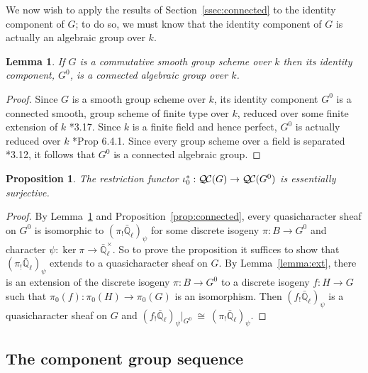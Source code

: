 \documentclass[CM,Submssn,SecEq]{degruyter-crelle} %
\theoremstyle{plain}
\newtheorem{proposition}[theorem]{Proposition}
\newtheorem{lemma}[theorem]{Lemma}
\theoremstyle{definition}
\theoremstyle{remark}
\newcommand{\EE}{\mathbb{\bar Q}_\ell}
\newcommand{\Fq}{k}
\newcommand{\EEx}{\EE^\times}
\newcommand{\iso}{{\ \cong\ }}
\newcommand{\qcs}[1]{{\mathcal{#1}}}
\newcommand{\QC}{{\mathcal{Q\hskip-0.8pt C}}}
\begin{document}
We now wish to apply the results of Section~\ref{ssec:connected} to the identity component of $G$; to do so, we must know that the identity component of $G$ is actually an algebraic group over $\Fq$.

\begin{lemma} \label{lem:G0alg-grp}
If $G$ is a commutative smooth group scheme over $\Fq$ then its identity component, $G^0$, is a connected algebraic group over $\Fq$.
\end{lemma}
\begin{proof}
 Since $G$ is a smooth group scheme over $\Fq$, its
 identity component $G^0$ is a connected smooth,
 group scheme of finite type over $\Fq$, reduced over some finite extension of $\Fq$
 \cite{vdGeer-Moonen:AbelianVarieties}*{3.17}.
 Since $\Fq$ is a finite field and hence perfect, $G^0$ is actually reduced over $\Fq$
 \cite{EGAIV2}*{Prop 6.4.1}.  Since every group scheme over a field is separated
 \cite{vdGeer-Moonen:AbelianVarieties}*{3.12},
 it follows that $G^0$ is a connected algebraic group.
\end{proof}

\begin{proposition}\label{prop:restriction}
The restriction functor $\iota_0^* : \QC(G)\to \QC(G^0)$ is essentially surjective.
\end{proposition}

\begin{proof}
  By Lemma~\ref{lem:G0alg-grp} and Proposition~\ref{prop:connected}, every
  quasicharacter sheaf on $G^0$ is isomorphic to $(\pi_! \EE)_\psi$ for some discrete isogeny $\pi : B \to G^0$ and character $\psi : \ker \pi \to \EEx$.
  So to prove the proposition it suffices to show that $(\pi_! \EE)_\psi$ extends to a quasicharacter sheaf on $G$.
%
 By Lemma~\ref{lemma:ext}, there is an extension of the
 discrete isogeny $\pi : B \to G^0$ to a discrete isogeny $f : H \to G$
 such that $\pi_0(f) : \pi_0(H)\to \pi_0(G)$ is an isomorphism.
 Then $(f_! \EE)_\psi$ is a quasicharacter sheaf on $G$ and
 $(f_! \EE)_\psi\vert_{G^0} \iso (\pi_! \EE)_\psi$.
\end{proof}

\subsection{The component group sequence} \label{ssec:component}
\end{document}
